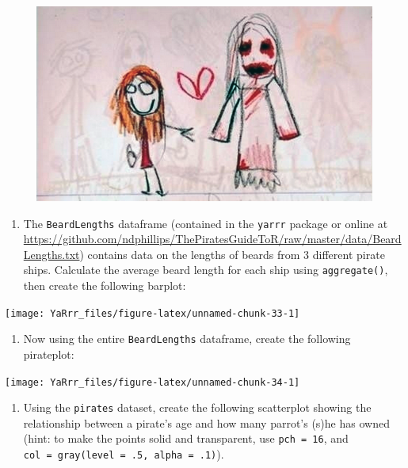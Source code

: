 \documentclass[]{book}
\providecommand{\tightlist}{%
  \setlength{\itemsep}{0pt}\setlength{\parskip}{0pt}}
\theoremstyle{definition}
\theoremstyle{definition}
\theoremstyle{remark}
\begin{document}
\begin{figure}

{\centering \includegraphics[width=0.75\linewidth]{images/scarydrawing} 

}

\end{figure}

\begin{enumerate}
\def\labelenumi{\arabic{enumi}.}
\tightlist
\item
  The \texttt{BeardLengths} dataframe (contained in the \texttt{yarrr}
  package or online at
  \url{https://github.com/ndphillips/ThePiratesGuideToR/raw/master/data/BeardLengths.txt})
  contains data on the lengths of beards from 3 different pirate ships.
  Calculate the average beard length for each ship using
  \texttt{aggregate()}, then create the following barplot:
\end{enumerate}

\begin{center}\texttt{[image: YaRrr\_files/figure-latex/unnamed-chunk-33-1]} \end{center}

\begin{enumerate}
\def\labelenumi{\arabic{enumi}.}
\setcounter{enumi}{1}
\tightlist
\item
  Now using the entire \texttt{BeardLengths} dataframe, create the
  following pirateplot:
\end{enumerate}

\begin{center}\texttt{[image: YaRrr\_files/figure-latex/unnamed-chunk-34-1]} \end{center}

\begin{enumerate}
\def\labelenumi{\arabic{enumi}.}
\setcounter{enumi}{2}
\tightlist
\item
  Using the \texttt{pirates} dataset, create the following scatterplot
  showing the relationship between a pirate's age and how many parrot's
  (s)he has owned (hint: to make the points solid and transparent, use
  \texttt{pch\ =\ 16}, and
  \texttt{col\ =\ gray(level\ =\ .5,\ alpha\ =\ .1)}).
\end{enumerate}
\end{document}
